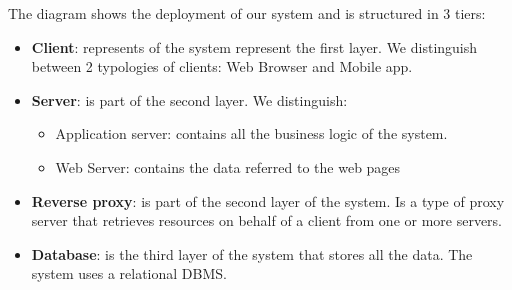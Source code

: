 The diagram shows the deployment of our system and is structured in 3 tiers:

\begin{itemize}
    \item \textbf{Client}: represents of the system represent the first layer. We distinguish between 2 typologies of clients: Web Browser and Mobile app.
    \item \textbf{Server}: is part of the second layer. 
    We distinguish:
    \begin{itemize}
        \item Application server: contains all the business logic of the system.
        \item Web Server: contains the data referred to the web pages
    \end{itemize}
    \item \textbf{Reverse proxy}: is part of the second layer of the system.
    Is a type of proxy server that retrieves resources on behalf of a client from one or more servers.
    \item \textbf{Database}: is the third layer of the system that stores all the data. 
    The system uses a relational DBMS.
\end{itemize}

